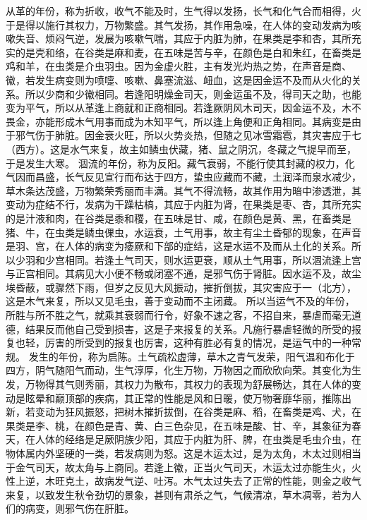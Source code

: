 \documentclass[12pt,UTF8]{ctexbook}
\begin{document}
从革的年份，称为折收，收气不能及时，生气得以发扬，长气和化气合而相得，火于是得以施行其权力，万物繁盛。其气发扬，其作用急噪，在人体的变动发病为咳嗽失音、烦闷气逆，发展为咳嗽气喘，其应于内脏为肺，在果类是李和杏，其所充实的是壳和络，在谷类是麻和麦，在五味是苦与辛，在颜色是白和朱红，在畜类是鸡和羊，在虫类是介虫羽虫。因为金虚火胜，主有发光灼热之势，在声音是商、徽，若发生病变则为喷嚏、咳嗽、鼻塞流滋、衄血，这是因金运不及而从火化的关系。所以少商和少徽相同。若逢阳明燥金司天，则金运虽不及，得司天之助，也能变为平气，所以从革逢上商就和正商相同。若逢厥阴风木司天，因金运不及，木不畏金，亦能形成木气用事而成为木知平气，所以逢上角便和正角相同。其病变是由于邪气伤于肺脏。因金衰火旺，所以火势炎热，但随之见冰雪霜雹，其灾害应于七（西方）。这是水气来复，故主如鳞虫伏藏，猪、鼠之阴沉，冬藏之气提早而至，于是发生大寒。
涸流的年份，称为反阳。藏气衰弱，不能行使其封藏的权力，化气因而昌盛，长气反见宣行而布达于四方，蛰虫应藏而不藏，土润泽而泉水减少，草木条达茂盛，万物繁荣秀丽而丰满。其气不得流畅，故其作用为暗中渗透泄，其变动为症结不行，发病为干躁枯槁，其应于内脏为肾，在果类是枣、杏，其所充实的是汁液和肉，在谷类是黍和稷，在五味是甘、咸，在颜色是黄、黑，在畜类是猪、牛，在虫类是鳞虫倮虫，水运衰，土气用事，故主有尘土昏郁的现象，在声音是羽、宫，在人体的病变为痿厥和下部的症结，这是水运不及而从土化的关系。所以少羽和少宫相同。若逢土气司天，则水运更衰，顺从土气用事，所以涸流逢上宫与正宫相同。其病见大小便不畅或闭塞不通，是邪气伤于肾脏。因水运不及，故尘埃昏蔽，或骤然下雨，但岁之反见大风振动，摧折倒拔，其灾害应于一（北方），这是木气来复，所以又见毛虫，善于变动而不主闭藏。
所以当运气不及的年份，所胜与所不胜之气，就乘其衰弱而行令，好象不速之客，不招自来，暴虐而毫无道德，结果反而他自己受到损害，这是子来报复的关系。凡施行暴虐轻微的所受的报复也轻，厉害的所受到的报复也厉害，这种有胜必有复的情况，是运气中的一种常规。
发生的年份，称为启陈。土气疏松虚薄，草木之青气发荣，阳气温和布化于四方，阴气随阳气而动，生气淳厚，化生万物，万物因之而欣欣向荣。其变化为生发，万物得其气则秀丽，其权力为散布，其权力的表现为舒展畅达，其在人体的变动是眩晕和巅顶部的疾病，其正常的性能是风和日暖，使万物奢靡华丽，推陈出新，若变动为狂风振怒，把树木摧折拔倒，在谷类是麻、稻，在畜类是鸡、犬，在果类是李、桃，在颜色是青、黄、白三色杂见，在五味是酸、甘、辛，其象征为春天，在人体的经络是足厥阴族少阳，其应于内脏为肝、脾，在虫类是毛虫介虫，在物体属内外坚硬的一类，若发病则为怒。这是木运太过，是为太角，木太过则相当于金气司天，故太角与上商同。若逢上徽，正当火气司天，木运太过亦能生火，火性上逆，木旺克土，故病发气逆、吐泻。木气太过失去了正常的性能，则金之收气来复，以致发生秋令劲切的景象，甚则有肃杀之气，气候清凉，草木凋零，若为人们的病变，则邪气伤在肝脏。
\end{document}
